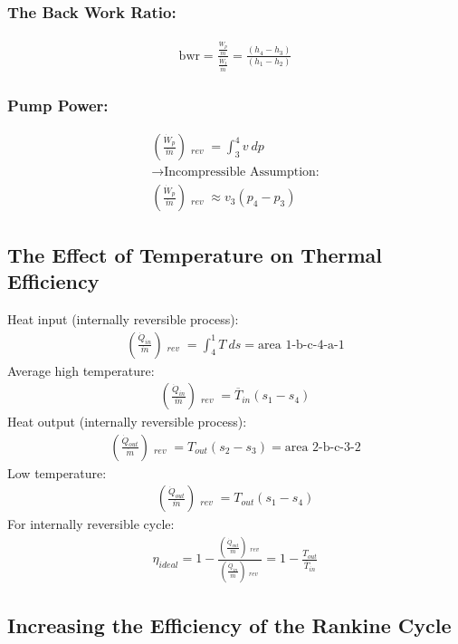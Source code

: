 \documentclass[class=report, crop=false, 12pt,a4paper]{standalone}
\numberwithin{equation}{section}
\begin{document}
\subsubsection{The Back Work Ratio:}
\begin{gather}
  \text{bwr} = \frac{\frac{\dot{W}_p}{\dot{m}}}{\frac{\dot{W}_t}{\dot{m}}} = \frac{(h_4-h_3)}{(h_1-h_2)}
\end{gather}
\subsubsection{Pump Power:}
\begin{gather}
  \left(\frac{\dot{W}_p}{\dot{m}}\right)\mathop{_{int}}_{rev} = \int_{3}^{4}v \ dp \\[5pt]
  \longrightarrow \text{Incompressible Assumption:} \\[5pt]
  \left(\frac{\dot{W}_p}{\dot{m}}\right)\mathop{_{int}}_{rev} \approx v_3(p_4-p_3)
\end{gather}
\subsection{The Effect of Temperature on Thermal Efficiency}
Heat input (internally reversible process):
\begin{gather}
  \left(\frac{\dot{Q}_{in}}{\dot{m}}\right)\mathop{_{int}}_{rev} = \int_{4}^{1}T \ ds = \text{area 1-b-c-4-a-1}
\end{gather}
Average high temperature:
\begin{gather}
  \left(\frac{\dot{Q}_{in}}{\dot{m}}\right)\mathop{_{int}}_{rev} = \overline{T}_{in}(s_1-s_4)
\end{gather}
Heat output (internally reversible process):
\begin{gather}
  \left(\frac{\dot{Q}_{out}}{\dot{m}}\right)\mathop{_{int}}_{rev} = T_{out}(s_2-s_3) = \text{area 2-b-c-3-2}
\end{gather}
Low temperature:
\begin{gather}
  \left(\frac{\dot{Q}_{out}}{\dot{m}}\right)\mathop{_{int}}_{rev} = T_{out}(s_1-s_4)
\end{gather}
For internally reversible cycle: 
\begin{gather}
  \eta_{ideal} = 1-\frac{\left(\frac{\dot{Q}_{out}}{\dot{m}}\right)\mathop{_{int}}_{rev}}{\left(\frac{\dot{Q}_{in}}{\dot{m}}\right)\mathop{_{int}}_{rev}} = 1-\frac{T_{out}}{\overline{T}_{in}}
\end{gather}
\subsection{Increasing the Efficiency of the Rankine Cycle}
\end{document}
